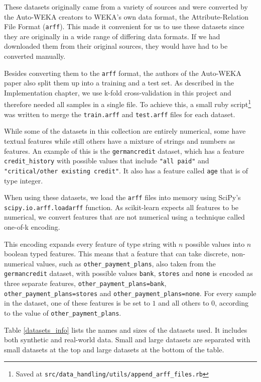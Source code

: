 \documentclass[a4paper,12pt,twoside,openright]{report}
\begin{document}
These datasets originally came from a variety of sources \cite{Lichman:2013, Larochelle:2007:EED:1273496.1273556, Krizhevsky09learningmultiple} and were converted by the Auto-WEKA creators to WEKA's own data format, the Attribute-Relation File Format (\texttt{arff}). This made it convenient for us to use these datasets since they are originally in a wide range of differing data formats. If we had downloaded them from their original sources, they would have had to be converted manually. 

Besides converting them to the \texttt{arff} format, the authors of the Auto-WEKA paper also split them up into a training and a test set. As described in the Implementation chapter, we use k-fold cross-validation in this project and therefore needed all samples in a single file. To achieve this, a small ruby script\footnote{Saved at \texttt{src/data\_handling/utils/append\_arff\_files.rb}} was written to merge the \texttt{train.arff} and \texttt{test.arff} files for each dataset.

While some of the datasets in this collection are entirely numerical, some have textual features while still others have a mixture of strings and numbers as features. An example of this is the \texttt{germancredit} dataset, which has a feature \texttt{credit\_history} with possible values that include \texttt{"all paid"} and \texttt{"critical/other existing credit"}. It also has a feature called \texttt{age} that is of type integer.

When using these datasets, we load the \texttt{arff} files into memory using SciPy's \texttt{scipy.io.arff.loadarff} function. As scikit-learn expects all features to  be numerical, we convert features that are not numerical using a technique called one-of-k encoding.

This encoding expands every feature of type string with $n$ possible values into $n$ boolean typed features. This means that a feature that can take discrete, non-numerical values, such as \texttt{other\_payment\_plans}, also taken from the \texttt{germancredit} dataset, with possible values \texttt{bank}, \texttt{stores} and \texttt{none} is encoded as three separate features, \texttt{other\_payment\_plans=bank}, \texttt{other\_payment\_plans=stores} and \texttt{other\_payment\_plans=none}. For every sample in the dataset, one of these features is be set to $1$ and all others to $0$, according to the value of \texttt{other\_payment\_plans}.

Table \ref{datasets_info} lists the names and sizes of the datasets used. It includes both synthetic and real-world data. Small and large datasets are separated with small datasets at the top and large datasets at the bottom of the table.
\end{document}
